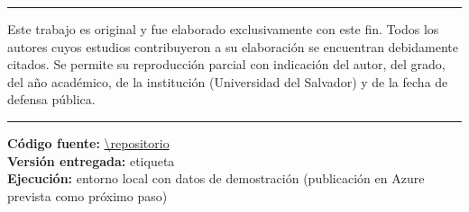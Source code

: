 
\mbox{}
\vfill

{\small\onehalfspacing
\begin{center}

\noindent\rule{\textwidth}{1pt} %

    Este trabajo es original y fue elaborado exclusivamente con este fin.
    Todos los autores cuyos estudios contribuyeron a su elaboración se
    encuentran debidamente citados. Se permite su reproducción parcial con
    indicación del autor, del grado, del año académico, de la institución
    (Universidad del Salvador) y de la fecha de defensa pública.

\noindent\rule{\textwidth}{.2pt} %

\end{center}

\noindent\textbf{Código fuente:} \url{\repositorio}\\
\textbf{Versión entregada:} etiqueta \texttt{\versionEntregada}\\
\textbf{Ejecución:} entorno local con datos de demostración (publicación en Azure prevista como próximo paso)
} %
